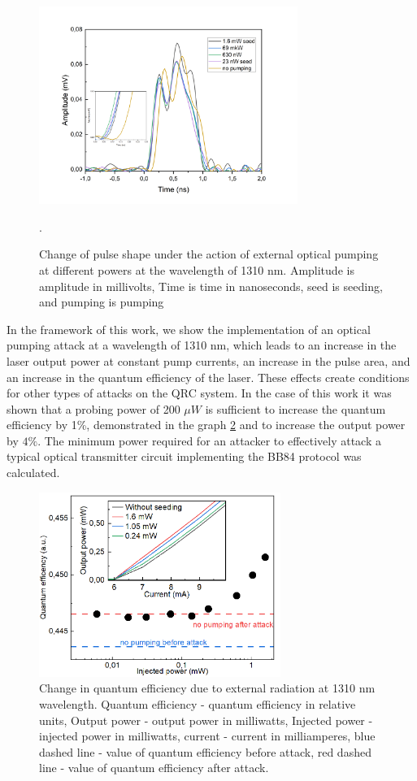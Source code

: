 \begin{figure}
    \centering
    \includegraphics[width=0.75\textwidth]{images/Импульсы под действием 1310 для диссера.png}
    \caption{Change of pulse shape under the action of external optical pumping at different powers at the wavelength of 1310 nm. Amplitude is amplitude in millivolts, Time is time in nanoseconds, seed is seeding, and pumping is pumping}.
    \label{fig:pulses 1310 syn}
\end{figure}
\newpage In the framework of this work, we show the implementation of an optical pumping attack at a wavelength of 1310 nm, which leads to an increase in the laser output power at constant pump currents, an increase in the pulse area, and an increase in the quantum efficiency of the laser. These effects create conditions for other types of attacks on the QRC system. In the case of this work it was shown that a probing power of 200 $\mu W$ is sufficient to increase the quantum efficiency by 1\%, demonstrated in the graph \ref{fig:eff syn} and to increase the output power by $4\%$. The minimum power required for an attacker to effectively attack a typical optical transmitter circuit implementing the BB84 protocol was calculated.
\begin{figure}
    \centering
    \includegraphics[width=0.7\textwidth]{images/Эффективность 1310.png}
    \caption{Change in quantum efficiency due to external radiation at 1310 nm wavelength. Quantum efficiency - quantum efficiency in relative units, Output power - output power in milliwatts, Injected power - injected power in milliwatts, current - current in milliamperes, blue dashed line - value of quantum efficiency before attack, red dashed line - value of quantum efficiency after attack. }
    \label{fig:eff syn}
\end{figure}
